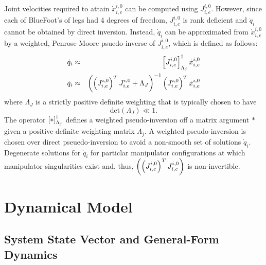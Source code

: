 			Joint velocities required to attain $\dot{x}^{i,0}_{i,e}$ can be computed using $J^{i,0}_{i,e}$. However, since each of BlueFoot's of legs had 4 degrees of freedom, $J^{i,0}_{i,e}$ is rank deficient and $\dot{q}_{i}$ cannot be obtained by direct inversion. Instead, $\dot{q}_{i}$ can be approximated from $\dot{x}^{i,0}_{i,e}$ by a weighted, Penrose-Moore psuedo-inverse of $J^{i,0}_{i,e}$, which is defined as follows:
				\begin{eqnarray}
					\dot{q}_{i} &\approx& \left[J^{i,0}_{i,e}\right]_{\Lambda_{j}}^{\dagger} \dot{x}^{i,0}_{i,e} \nonumber \\
					\dot{q}_{i} &\approx& \left( \left(J^{i,0}_{i,e}\right)^{T}J^{i,0}_{i,e} + \Lambda_{J} \right)^{-1} \left(J^{i,0}_{i,e}\right)^{T}\dot{x}^{i,0}_{i,e}
				\end{eqnarray}
			where $\Lambda_{J}$ is a strictly positive definite weighting that is typically chosen to have 
				\begin{equation*}
					\text{det}(\Lambda_{J}) \ll 1.
				\end{equation*}
			The operator $\left[*\right]_{\Lambda_{j}}^{\dagger}$ defines a weighted pseudo-inversion off a matrix argument $*$ given a positive-definite weighting matrix $\Lambda_{j}$. A weighted pseudo-inversion is chosen over direct pseuedo-inversion to avoid a non-smooth set of solutions $\dot{q}_{i}$. Degenerate solutions for $\dot{q}_{i}$ for particlar manipulator configurations at which manipulator singularities exist and, thus, $\left(\left(J^{i,0}_{i,e}\right)^{T}J^{i,0}_{i,e}\right)$ is non-invertible.




	\section{Dynamical Model}
	

		\subsection{System State Vector and General-Form Dynamics}
		
